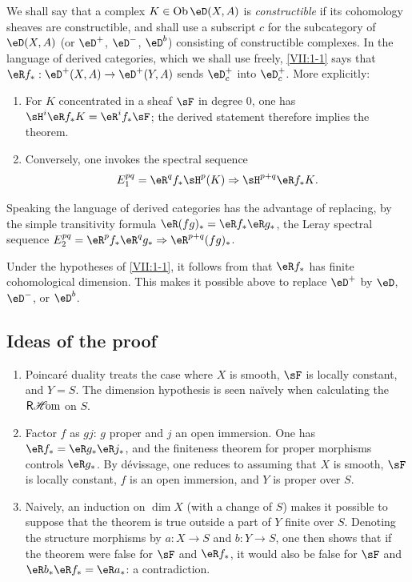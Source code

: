 We shall say that a complex $K\in\ob\eD(X,A)$ is \emph{constructible} if its
cohomology sheaves are constructible, and shall use a subscript $c$ for the
subcategory of $\eD(X,A)$ (or $\eD^+$, $\eD^-$, $\eD^b$) consisting of
constructible complexes. In the language of derived categories, which we
shall use freely, \ref{VII:1-1} says that
$\eR f_\ast:\eD^+(X,A) \to \eD^+(Y,A)$ sends $\eD_c^+$ into $\eD_c^+$.
More explicitly:
\begin{enumerate}[\indent a)]
  \item For $K$ concentrated in a sheaf $\sF$ in degree $0$, one has
    $\sH^i\eR f_\ast K = \eR^i f_\ast \sF$; the derived statement therefore
    implies the theorem.
  \item Conversely, one invokes the spectral sequence
    \[
      E_1^{p q} = \eR^q f_\ast \sH^p(K) \Rightarrow \sH^{p+q} \eR f_\ast K \text{.}
    \]
\end{enumerate}

Speaking the language of derived categories has the advantage of replacing,
by the simple transitivity formula $\eR(f g)_\ast = \eR f_\ast \eR g_\ast$,
the Leray spectral sequence
$E_2^{p q} = \eR^p f_\ast \eR^q g_\ast \Rightarrow \eR^{p+q} (f g)_\ast$.

Under the hypotheses of \ref{VII:1-1}, it follows from \cite{sga4} that
$\eR f_\ast$ has finite cohomological dimension. This makes it possible above
to replace $\eD^+$ by $\eD$, $\eD^-$, or $\eD^b$.






\subsection{Ideas of the proof}\label{VII:1-4}
\begin{enumerate}[\indent a)]
  \item Poincaré duality treats the case where $X$ is smooth, $\sF$ is
    locally constant, and $Y=S$. The dimension hypothesis is seen na\"ively
    when calculating the $\operatorname{\mathsf{R}\mathscr{H}\!om}$ on $S$.
  \item Factor $f$ as $g j$: $g$ proper and $j$ an open immersion. One has
    $\eR f_\ast = \eR g_\ast \eR j_\ast$, and the finiteness theorem for
    proper morphisms controls $\eR g_\ast$. By dévissage, one reduces to
    assuming that $X$ is smooth, $\sF$ is locally constant, $f$ is an open
    immersion, and $Y$ is proper over $S$.
  \item Naively, an induction on $\dim X$ (with a change of $S$) makes it
    possible to suppose that the theorem is true outside a part of $Y$ finite
    over $S$. Denoting the structure morphisms by $a:X\to S$ and $b:Y\to S$,
    one then shows that if the theorem were false for $\sF$ and
    $\eR f_\ast$, it would also be false for $\sF$ and
    $\eR b_\ast \eR f_\ast = \eR a_\ast$: a contradiction.
\end{enumerate}






